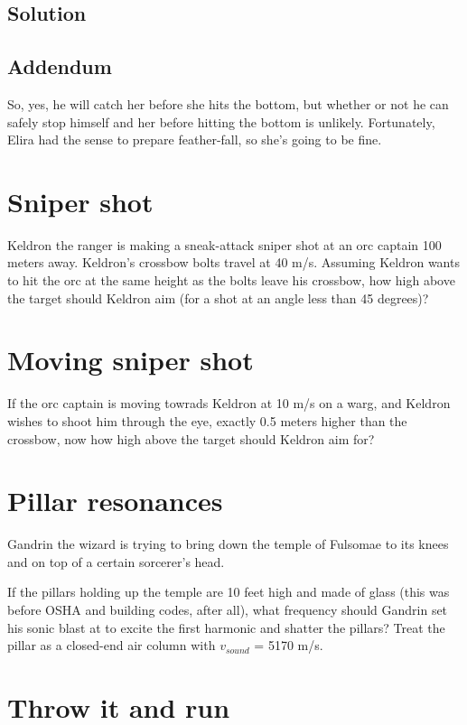 \documentclass[12pt,letterpaper]{article}
\begin{document}
\subsection{Solution}

\subsection{Addendum}
So, yes, he will catch her before she hits the bottom, but whether or not he can safely stop himself and her before hitting the bottom is unlikely. Fortunately, Elira had the sense to prepare feather-fall, so she's going to be fine.

\section{Sniper shot}

Keldron the ranger is making a sneak-attack sniper shot at an orc captain 100 meters away. Keldron's crossbow bolts travel at 40 m/s. Assuming Keldron wants to hit the orc at the same height as the bolts leave his crossbow, how high above the target should Keldron aim (for a shot at an angle less than 45 degrees)?

\section{Moving sniper shot}

If the orc captain is moving towrads Keldron at 10 m/s on a warg, and Keldron wishes to shoot him through the eye, exactly 0.5 meters higher than the crossbow, now how high above the target should Keldron aim for?

\section{Pillar resonances}

Gandrin the wizard is trying to bring down the temple of Fulsomae to its knees and on top of a certain sorcerer's head.

If the pillars holding up the temple are 10 feet high and made of glass (this was before OSHA and building codes, after all), what frequency should Gandrin set his sonic blast at to excite the first harmonic and shatter the pillars? Treat the pillar as a closed-end air column with $v_{sound}$ = 5170 m/s.

\section{Throw it and run}
\end{document}
